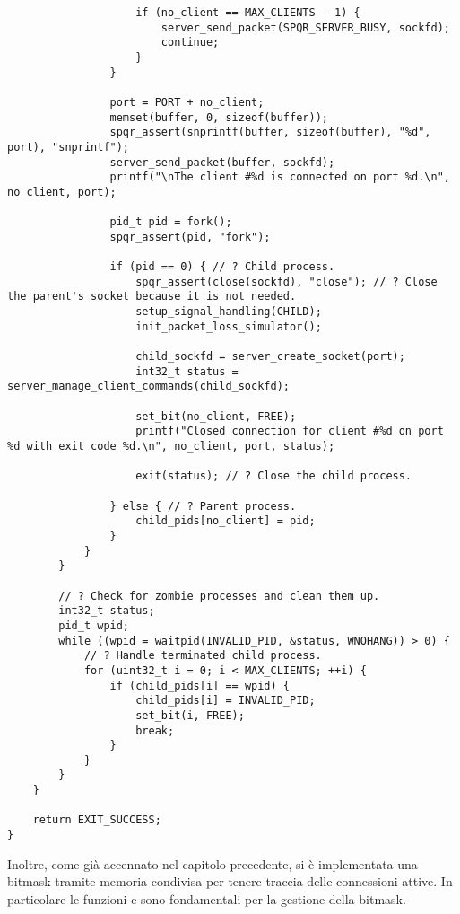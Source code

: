 \begin{lstlisting}
                    if (no_client == MAX_CLIENTS - 1) {
                        server_send_packet(SPQR_SERVER_BUSY, sockfd);
                        continue;
                    }
                }

                port = PORT + no_client;
                memset(buffer, 0, sizeof(buffer));
                spqr_assert(snprintf(buffer, sizeof(buffer), "%d", port), "snprintf");
                server_send_packet(buffer, sockfd);
                printf("\nThe client #%d is connected on port %d.\n", no_client, port);

                pid_t pid = fork();
                spqr_assert(pid, "fork");
                
                if (pid == 0) { // ? Child process.
                    spqr_assert(close(sockfd), "close"); // ? Close the parent's socket because it is not needed.
                    setup_signal_handling(CHILD);
                    init_packet_loss_simulator();
                    
                    child_sockfd = server_create_socket(port);
                    int32_t status = server_manage_client_commands(child_sockfd);
                    
                    set_bit(no_client, FREE);
                    printf("Closed connection for client #%d on port %d with exit code %d.\n", no_client, port, status);
                    
                    exit(status); // ? Close the child process.

                } else { // ? Parent process.
                    child_pids[no_client] = pid;
                }
            }
        }

        // ? Check for zombie processes and clean them up.
        int32_t status;
        pid_t wpid;
        while ((wpid = waitpid(INVALID_PID, &status, WNOHANG)) > 0) {
            // ? Handle terminated child process.
            for (uint32_t i = 0; i < MAX_CLIENTS; ++i) {
                if (child_pids[i] == wpid) {
                    child_pids[i] = INVALID_PID;
                    set_bit(i, FREE);
                    break;
                }
            }
        }
    }

    return EXIT_SUCCESS;
}
\end{lstlisting}

Inoltre, come già accennato nel capitolo precedente, si è implementata una bitmask tramite memoria condivisa per tenere traccia delle connessioni attive.
In particolare le funzioni  e  sono fondamentali per la gestione della bitmask.

